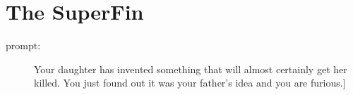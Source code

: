 \section*{The SuperFin}

\begin{description}
\item[prompt:] Your daughter has invented something that will almost certainly get her killed. You just found out it was your father's idea and you are furious.]
\end{description}
